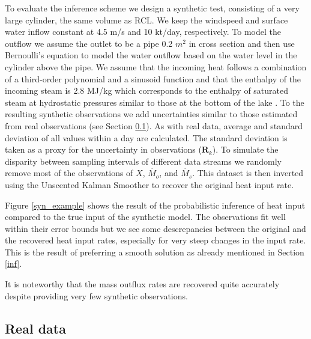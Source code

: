 \documentclass[doublespacing, linenumbers]{bmcart}
\newcommand{\bm}[1]{{\textbf{#1}}}
\begin{document}
To evaluate the inference scheme we design a synthetic test, consisting of a
very large cylinder, the same volume as RCL. We keep the windspeed and surface
water inflow constant at 4.5 m/s and 10 kt/day, respectively. To model the
outflow we assume the outlet to be a pipe 0.2 $m^2$ in cross section and then
use Bernoulli's equation to model the water outflow based on the water level in
the cylinder above the pipe. We assume that the incoming heat follows a
combination of a third-order polynomial and a sinusoid function and that the
enthalpy of the incoming steam is 2.8 MJ/kg which corresponds to the enthalpy of
saturated steam at hydrostatic pressures similar to those at the bottom of the
lake \cite{Mayhew1978}. To the resulting synthetic observations we add
uncertainties similar to those estimated from real observations (see Section
\ref{realdata}). As with real data, average and standard deviation of all values
within a day are calculated. The standard deviation is taken as a proxy for the
uncertainty in observations ($\bm{R}_k$). To simulate the disparity between sampling
intervals of different data streams we randomly remove most of the observations
of $X$, $\dot{M_o}$, and $\dot{M_s}$. This dataset is then inverted using the
Unscented Kalman Smoother to recover the original heat input rate. 

Figure \ref{syn_example} shows the result of the probabilistic inference of heat
input compared to the true input of the synthetic model. The observations fit
well within their error bounds but we see some descrepancies between the
original and the recovered heat input rates, especially for very steep changes
in the input rate. This is the result of preferring a smooth solution as already
mentioned in Section \ref{inf}.

It is noteworthy that the mass outflux rates are recovered quite accurately
despite providing very few synthetic observations.

\subsection{Real data}\label{realdata} 
\end{document}
